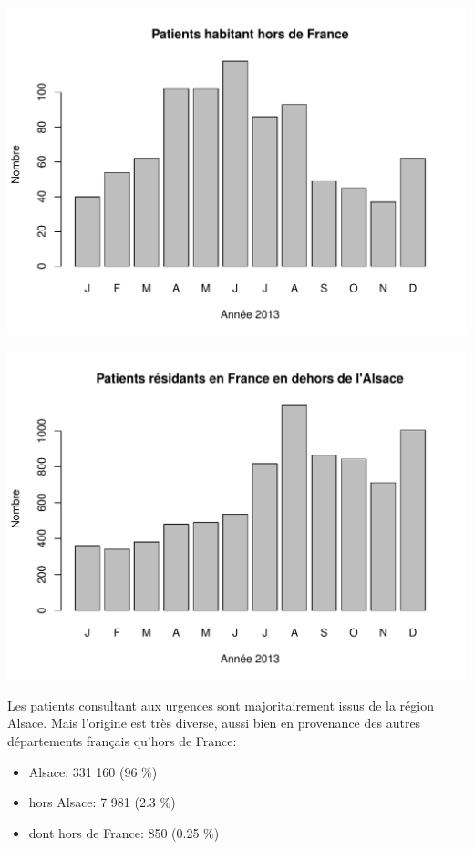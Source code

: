 \documentclass[12pt,english,french,twoside]{book}\usepackage[]{graphicx}\usepackage[]{color}
\makeatletter
\def\maxwidth{ %
  \ifdim\Gin@nat@width>\linewidth
    \linewidth
  \else
    \Gin@nat@width
  \fi
}
\newenvironment{knitrout}{}{} %
\makeatother
\begin{document}
\begin{knitrout}
\color{fgcolor}
\includegraphics[width=\maxwidth]{figure/origine_geo-1} 

\includegraphics[width=\maxwidth]{figure/origine_geo-2} 

\end{knitrout}
Les patients consultant aux urgences sont majoritairement issus de la région Alsace. Mais l'origine est très diverse, aussi bien en provenance des autres départements français qu'hors de France:
 \begin{itemize}
   \item Alsace: 331 160 (96 \%) 
   \item hors Alsace: 7 981 (2.3 \%) 
   \item dont hors de France: 850 (0.25 \%) 
 \end{itemize}
\end{document}
